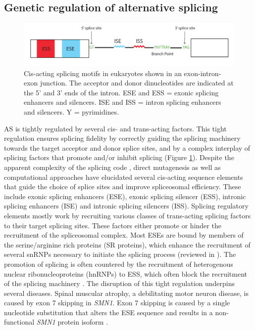 \subsection{Genetic regulation of alternative splicing}
\begin{figure}[H]
    \centering
    \includegraphics[width=\textwidth]{splicing_motifs}
    \caption[Cis-acting splicing motifs in eukaryotes]{Cis-acting splicing motifs in eukaryotes shown in an exon-intron-exon junction. The acceptor and donor dinucleotides are indicated at the 5' and 3' ends of the intron. ESE and ESS = exonic splicing enhancers and silencers. ISE and ISS = intron splicing enhancers and silencers. Y = pyrimidines.}
    \label{fig:splicing_motifs}   
  \end{figure}
AS is tightly regulated by several cis- and trans-acting factors. This tight regulation ensures splicing fidelity by correctly guiding the splicing machinery towards the target acceptor and donor splice sites, and by a complex interplay of splicing factors that promote and/or inhibit splicing (Figure \ref{fig:splicing_motifs}). Despite the apparent complexity of the splicing code \cite{Jaganathan2019-ah}, direct mutagenesis as well as computational approaches have elucidated several cis-acting sequence elements that guide the choice of splice sites and improve spliceosomal efficiency. These include exonic splicing enhancers (ESE), exonic splicing silencer (ESS), intronic splicing enhancers (ISE) and intronic splicing silencers (ISS). Splicing regulatory elements mostly work by recruiting various classes of trans-acting splicing factors to their target splicing sites. These factors either promote or hinder the recruitment of the spliceosomal complex. Most ESEs are bound by members of the serine/arginine rich proteins (SR proteins), which enhance the recruitment of several snRNPs necessary to initiate the splicing process (reviewed in \cite{Shepard2009-os}). The promotion of splicing is often countered by the recruitment of heterogenous nuclear ribonucleoproteins (hnRNPs) to ESS, which often block the recruitment of the splicing machinery \cite{Geuens2016-yz}. The disruption of this tight regulation underpins several diseases. Spinal muscular atrophy, a debilitating motor neuron disease, is caused by exon 7 skipping in \textit{SMN1}. Exon 7 skipping is caused by a single nucleotide substitution that alters the ESE sequence and results in a non-functional \textit{SMN1} protein isoform \cite{Monani1999-vf}.\\

